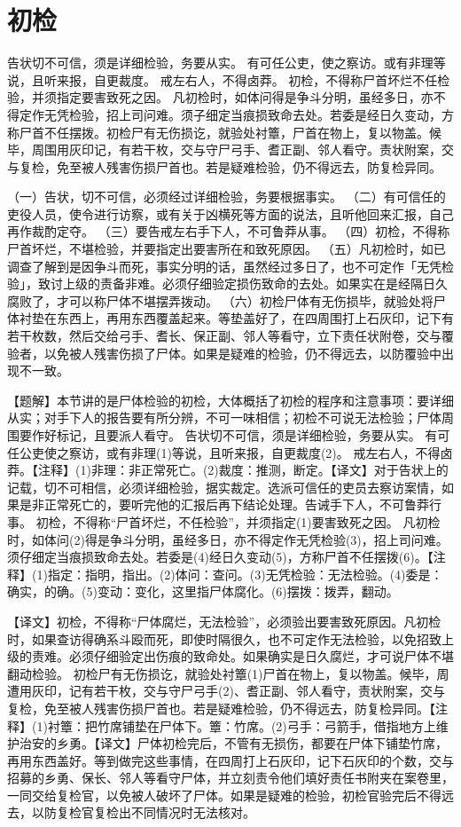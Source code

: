 \documentclass[12pt,UTF8]{ctexbook}
\begin{document}
\chapter{初检}

告状切不可信，须是详细检验，务要从实。
有可任公吏，使之察访。或有非理等说，且听来报，自更裁度。
戒左右人，不得卤莽。
初检，不得称尸首坏烂不任检验，并须指定要害致死之因。
凡初检时，如体问得是争斗分明，虽经多日，亦不得定作无凭检验，招上司问难。须子细定当痕损致命去处。若委是经日久变动，方称尸首不任摆拨。初检尸有无伤损讫，就验处衬簟，尸首在物上，复以物盖。候毕，周围用灰印记，有若干枚，交与守尸弓手、耆正副、邻人看守。责状附案，交与复检，免至被人残害伤损尸首也。若是疑难检验，仍不得远去，防复检异同。


（一）告状，切不可信，必须经过详细检验，务要根据事实。
（二）有可信任的吏役人员，使令进行访察，或有关于凶横死等方面的说法，且听他回来汇报，自己再作裁酌定夺。
（三）要告戒左右手下人，不可鲁莽从事。
（四）初检，不得称尸首坏烂，不堪检验，并要指定出要害所在和致死原因。
（五）凡初检时，如已调查了解到是因争斗而死，事实分明的话，虽然经过多日了，也不可定作「无凭检验」，致讨上级的责备非难。必须仔细验定损伤致命的去处。如果实在是经隔日久腐败了，才可以称尸体不堪摆弄拨动。
（六）初检尸体有无伤损毕，就验处将尸体衬垫在东西上，再用东西覆盖起来。等垫盖好了，在四周围打上石灰印，记下有若干枚数，然后交给弓手、耆长、保正副、邻人等看守，立下责任状附卷，交与覆验者，以免被人残害伤损了尸体。如果是疑难的检验，仍不得远去，以防覆验中出现不一致。

【题解】本节讲的是尸体检验的初检，大体概括了初检的程序和注意事项：要详细从实；对手下人的报告要有所分辨，不可一味相信；初检不可说无法检验；尸体周围要作好标记，且要派人看守。
告状切不可信，须是详细检验，务要从实。
有可任公吏使之察访，或有非理(1)等说，且听来报，自更裁度(2)。
戒左右人，不得卤莽。【注释】(1)非理：非正常死亡。(2)裁度：推测，断定。【译文】对于告状上的记载，切不可相信，必须详细检验，据实裁定。选派可信任的吏员去察访案情，如果是非正常死亡的，要听完他的汇报后再下结论处理。告诫手下人，不可鲁莽行事。
初检，不得称“尸首坏烂，不任检验”，并须指定(1)要害致死之因。
凡初检时，如体问(2)得是争斗分明，虽经多日，亦不得定作无凭检验(3)，招上司问难。须仔细定当痕损致命去处。若委是(4)经日久变动(5)，方称尸首不任摆拨(6)。【注释】(1)指定：指明，指出。(2)体问：查问。(3)无凭检验：无法检验。(4)委是：确实，的确。(5)变动：变化，这里指尸体腐化。(6)摆拨：拨弄，翻动。

【译文】初检，不得称“尸体腐烂，无法检验”，必须验出要害致死原因。凡初检时，如果查访得确系斗殴而死，即使时隔很久，也不可定作无法检验，以免招致上级的责难。必须仔细验定出伤痕的致命处。如果确实是日久腐烂，才可说尸体不堪翻动检验。
初检尸有无伤损讫，就验处衬簟(1)尸首在物上，复以物盖。候毕，周遭用灰印，记有若干枚，交与守尸弓手(2)、耆正副、邻人看守，责状附案，交与复检，免至被人残害伤损尸首也。若是疑难检验，仍不得远去，防复检异同。【注释】(1)衬簟：把竹席铺垫在尸体下。簟：竹席。(2)弓手：弓箭手，借指地方上维护治安的乡勇。【译文】尸体初检完后，不管有无损伤，都要在尸体下铺垫竹席，再用东西盖好。等到做完这些事情，在四周打上石灰印，记下石灰印的个数，交与招募的乡勇、保长、邻人等看守尸体，并立刻责令他们填好责任书附夹在案卷里，一同交给复检官，以免被人破坏了尸体。如果是疑难的检验，初检官验完后不得远去，以防复检官复检出不同情况时无法核对。
\end{document}
